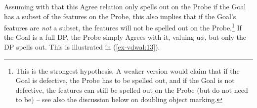 \documentclass[output=paper
,modfonts
,nonflat]{langsci/langscibook}
\begin{document}
\begin{exe}
	\ex \label{ex-vdwal:12}
	\xlist
	\endxlist
\end{exe} 
\noindent Assuming with \citet{Roberts2010} that this Agree relation only spells out on the Probe if the Goal has a subset of the features on the Probe, this also implies that if the Goal’s features are \textit{not} a subset, the features will not be spelled out on the Probe.\footnote{This is the strongest hypothesis. A weaker version would claim that if the Goal is defective, the Probe has to be spelled out, and if the Goal is not defective, the features can still be spelled out on the Probe (but do not need to be) -- see also the discussion below on doubling object marking.} If the Goal is a full DP, the Probe simply Agrees with it, valuing u$\phi$, but only the DP spells out. This is illustrated in (\ref{ex-vdwal:13}).
\end{document}
